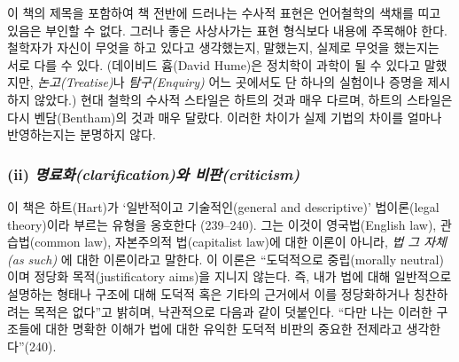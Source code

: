 \documentclass[12pt, oneside]{book}  %
\begin{document}
이 책의 제목을 포함하여 책 전반에 드러나는 수사적 표현은 언어철학의
색채를 띠고 있음은 부인할 수 없다. 그러나 좋은 사상사가는 표현 형식보다
내용에 주목해야 한다. 철학자가 자신이 무엇을 하고 있다고 생각했는지,
말했는지, 실제로 무엇을 했는지는 서로 다를 수 있다. (데이비드 흄(David
Hume)은 정치학이 과학이 될 수 있다고 말했지만, \emph{논고(Treatise)}나
\emph{탐구(Enquiry)} 어느 곳에서도 단 하나의 실험이나 증명을 제시하지
않았다.) 현대 철학의 수사적 스타일은 하트의 것과 매우 다르며, 하트의
스타일은 다시 벤담(Bentham)의 것과 매우 달랐다. 이러한 차이가 실제
기법의 차이를 얼마나 반영하는지는 분명하지 않다.

\subsubsection{\texorpdfstring{(ii) \emph{명료화(clarification)와
비판(criticism)}}{(ii) 명료화(clarification)와 비판(criticism)}}\label{ii-uxba85uxb8ccuxd654clarificationuxc640-uxbe44uxd310criticism}

이 책은 하트(Hart)가 `일반적이고 기술적인(general and descriptive)'
법이론(legal theory)이라 부르는 유형을 옹호한다 (239--240). 그는 이것이
영국법(English law), 관습법(common law), 자본주의적 법(capitalist law)에
대한 이론이 아니라, \emph{법 그 자체(as such)} 에 대한 이론이라고
말한다. 이 이론은 ``도덕적으로 중립(morally neutral)이며 정당화
목적(justificatory aims)을 지니지 않는다. 즉, 내가 법에 대해 일반적으로
설명하는 형태나 구조에 대해 도덕적 혹은 기타의 근거에서 이를
정당화하거나 칭찬하려는 목적은 없다''고 밝히며, 낙관적으로 다음과 같이
덧붙인다. ``다만 나는 이러한 구조들에 대한 명확한 이해가 법에 대한
유익한 도덕적 비판의 중요한 전제라고 생각한다''(240).
\end{document}

